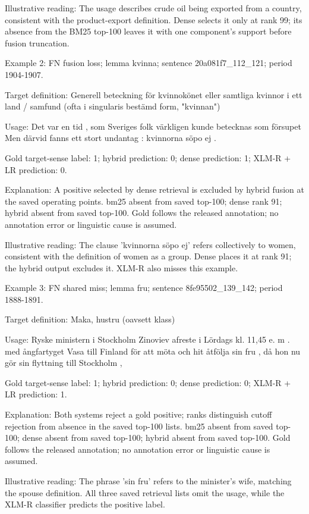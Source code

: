 Illustrative reading: The usage describes crude oil being exported from a country, consistent with the product-export definition. Dense selects it only at rank 99; its absence from the BM25 top-100 leaves it with one component's support before fusion truncation.

Example 2: FN fusion loss; lemma kvinna; sentence 20a081f7\_112\_121; period 1904-1907.

Target definition: Generell beteckning för kvinnokönet eller samtliga kvinnor i ett land / samfund (ofta i singularis bestämd form, "kvinnan")

Usage: Det var en tid , som Sveriges folk värkligen kunde betecknas som försupet Men därvid fanns ett stort undantag : kvinnorna söpo ej .

Gold target-sense label: 1; hybrid prediction: 0; dense prediction: 1; XLM-R + LR prediction: 0.

Explanation: A positive selected by dense retrieval is excluded by hybrid fusion at the saved operating points. bm25 absent from saved top-100; dense rank 91; hybrid absent from saved top-100. Gold follows the released annotation; no annotation error or linguistic cause is assumed.

Illustrative reading: The clause 'kvinnorna söpo ej' refers collectively to women, consistent with the definition of women as a group. Dense places it at rank 91; the hybrid output excludes it. XLM-R also misses this example.

Example 3: FN shared miss; lemma fru; sentence 8fe95502\_139\_142; period 1888-1891.

Target definition: Maka, hustru (oavsett klass)

Usage: Ryske ministern i Stockholm Zinoviev afreste i Lördags kl. 11,45 e. m . med ångfartyget Vasa till Finland för att möta och hit åtfölja sin fru , då hon nu gör sin flyttning till Stockholm ,

Gold target-sense label: 1; hybrid prediction: 0; dense prediction: 0; XLM-R + LR prediction: 1.

Explanation: Both systems reject a gold positive; ranks distinguish cutoff rejection from absence in the saved top-100 lists. bm25 absent from saved top-100; dense absent from saved top-100; hybrid absent from saved top-100. Gold follows the released annotation; no annotation error or linguistic cause is assumed.

Illustrative reading: The phrase 'sin fru' refers to the minister's wife, matching the spouse definition. All three saved retrieval lists omit the usage, while the XLM-R classifier predicts the positive label.

